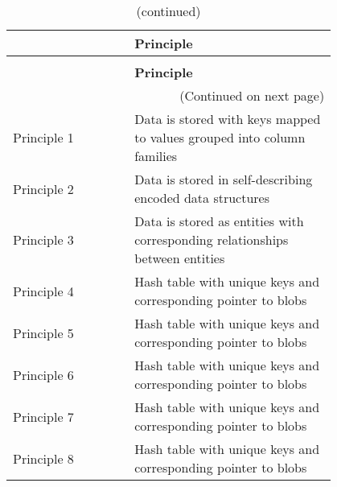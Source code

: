 \begin{longtable}{p{0.30\linewidth} p{0.50\linewidth}}
 
\caption{Design Principles}
\label{tab:design-principles} \\
 \toprule
 \textbf{} & \textbf{Principle}\\

 \midrule
 \endfirsthead
 
 \caption[]{(continued)}\\
 \toprule
 \textbf{} & \textbf{Principle}\\
 \midrule
 \endhead
 
 \midrule
 \multicolumn{2}{r}{(Continued on next page)} \\
 \endfoot
 
 \bottomrule
 \endlastfoot
 
 Principle 1&
 Data is stored with keys mapped to values grouped into column families\\
 
 
 Principle 2&
 Data is stored in self-describing encoded data structures\\
 
 
 Principle 3&
 Data is stored as entities with corresponding relationships between entities\\
 
 
 Principle 4&
 Hash table with unique keys and corresponding pointer to blobs\\
 
 
 Principle 5&
 Hash table with unique keys and corresponding pointer to blobs\\
 
 
 Principle 6&
 Hash table with unique keys and corresponding pointer to blobs\\

 
 Principle 7&
 Hash table with unique keys and corresponding pointer to blobs\\

 
 Principle 8&
 Hash table with unique keys and corresponding pointer to blobs\\

\end{longtable}
